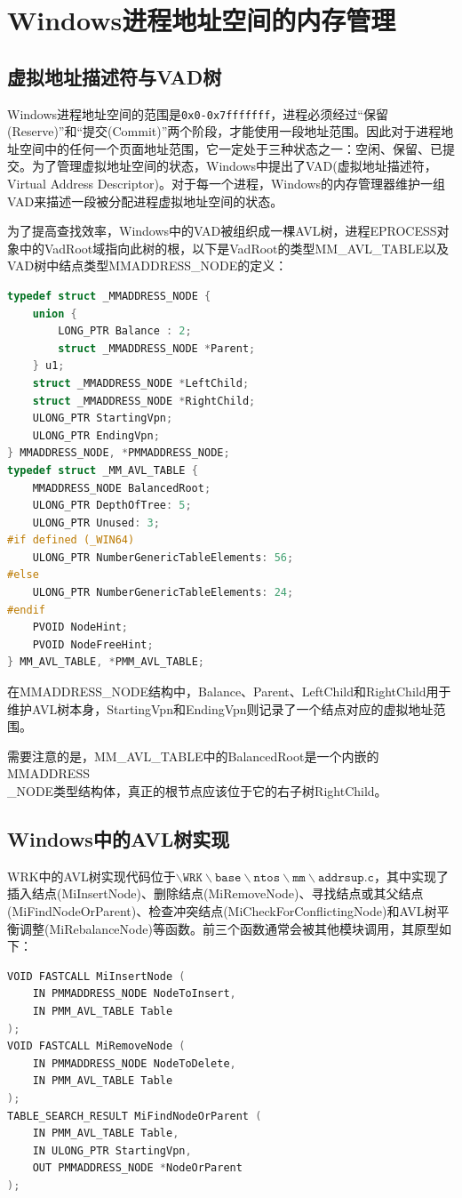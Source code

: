 \documentclass[a4paper, 11pt]{article}
\begin{document}
    \section{Windows进程地址空间的内存管理}
        \subsection{虚拟地址描述符与VAD树}
            Windows进程地址空间的范围是\texttt{0x0-0x7fffffff}，进程必须经过“保留(Reserve)”和“提交(Commit)”两个阶段，才能使用一段地址范围。因此对于进程地址空间中的任何一个页面地址范围，它一定处于三种状态之一：空闲、保留、已提交。为了管理虚拟地址空间的状态，Windows中提出了VAD(虚拟地址描述符，Virtual Address Descriptor)。对于每一个进程，Windows的内存管理器维护一组VAD来描述一段被分配进程虚拟地址空间的状态\cite{ModernOS}。
            
            为了提高查找效率，Windows中的VAD被组织成一棵AVL树，进程EPROCESS对象中的VadRoot域指向此树的根，以下是VadRoot的类型MM\_AVL\_TABLE以及VAD树中结点类型MMADDRESS\_NODE的定义\cite{WinKernel}：
\begin{lstlisting}[language={C}]
typedef struct _MMADDRESS_NODE {
    union {
        LONG_PTR Balance : 2;
        struct _MMADDRESS_NODE *Parent;
    } u1;
    struct _MMADDRESS_NODE *LeftChild;
    struct _MMADDRESS_NODE *RightChild;
    ULONG_PTR StartingVpn;
    ULONG_PTR EndingVpn;
} MMADDRESS_NODE, *PMMADDRESS_NODE;
typedef struct _MM_AVL_TABLE {
    MMADDRESS_NODE BalancedRoot;
    ULONG_PTR DepthOfTree: 5;
    ULONG_PTR Unused: 3;
#if defined (_WIN64)
    ULONG_PTR NumberGenericTableElements: 56;
#else
    ULONG_PTR NumberGenericTableElements: 24;
#endif
    PVOID NodeHint;
    PVOID NodeFreeHint;
} MM_AVL_TABLE, *PMM_AVL_TABLE;
\end{lstlisting}

            在MMADDRESS\_NODE结构中，Balance、Parent、LeftChild和RightChild用于维护AVL树本身，StartingVpn和EndingVpn则记录了一个结点对应的虚拟地址范围。
            
            需要注意的是，MM\_AVL\_TABLE中的BalancedRoot是一个内嵌的MMADDRESS \\ \_NODE类型结构体，真正的根节点应该位于它的右子树RightChild。
            
        \subsection{Windows中的AVL树实现}
            WRK中的AVL树实现代码位于$\mathtt{\backslash WRK \backslash base \backslash ntos \backslash mm \backslash addrsup.c}$，其中实现了插入结点(MiInsertNode)、删除结点(MiRemoveNode)、寻找结点或其父结点(MiFindNodeOrParent)、检查冲突结点(MiCheckForConflictingNode)和AVL树平衡调整(MiRebalanceNode)等函数。前三个函数通常会被其他模块调用，其原型如下：
\begin{lstlisting}[language={C}]
VOID FASTCALL MiInsertNode (
    IN PMMADDRESS_NODE NodeToInsert,
    IN PMM_AVL_TABLE Table
);
VOID FASTCALL MiRemoveNode (
    IN PMMADDRESS_NODE NodeToDelete,
    IN PMM_AVL_TABLE Table
);
TABLE_SEARCH_RESULT MiFindNodeOrParent (
    IN PMM_AVL_TABLE Table,
    IN ULONG_PTR StartingVpn,
    OUT PMMADDRESS_NODE *NodeOrParent
);
\end{lstlisting}
        
\end{document}

